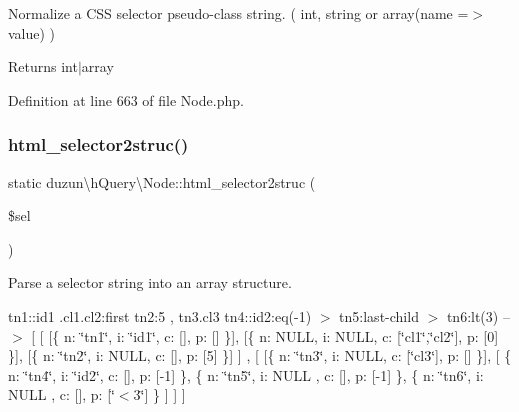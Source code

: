 Normalize a C\+SS selector pseudo-\/class string. ( int, string or array(name =$>$ value) )

\begin{DoxyReturn}{Returns}
int$\vert$array 
\end{DoxyReturn}


Definition at line 663 of file Node.\+php.

\mbox{\label{classduzun_1_1hQuery_1_1Node_ac54f15080a896a8bad6bb21bddf56bac}} 
\subsubsection{\texorpdfstring{html\+\_\+selector2struc()}{html\_selector2struc()}}
{\footnotesize\ttfamily static duzun\textbackslash{}h\+Query\textbackslash{}\+Node\+::html\+\_\+selector2struc (\begin{DoxyParamCaption}\item[{}]{\$sel }\end{DoxyParamCaption})\hspace{0.3cm}{\ttfamily [static]}}

Parse a selector string into an array structure.

tn1\+::id1 .cl1.\+cl2\+:first tn2\+:5 , tn3.\+cl3 tn4\+::id2\+:eq(-\/1) $>$ tn5\+:last-\/child $>$ tn6\+:lt(3) --$>$ \mbox{[} \mbox{[} \mbox{[}\{ n\+: \char`\"{}tn1\char`\"{}, i\+: \char`\"{}id1\char`\"{}, c\+: \mbox{[}\mbox{]}, p\+: \mbox{[}\mbox{]} \}\mbox{]}, \mbox{[}\{ n\+: N\+U\+LL, i\+: N\+U\+LL, c\+: \mbox{[}\char`\"{}cl1\char`\"{},\char`\"{}cl2\char`\"{}\mbox{]}, p\+: \mbox{[}0\mbox{]} \}\mbox{]}, \mbox{[}\{ n\+: \char`\"{}tn2\char`\"{}, i\+: N\+U\+LL, c\+: \mbox{[}\mbox{]}, p\+: \mbox{[}5\mbox{]} \}\mbox{]} \mbox{]} , \mbox{[} \mbox{[}\{ n\+: \char`\"{}tn3\char`\"{}, i\+: N\+U\+LL, c\+: \mbox{[}\char`\"{}cl3\char`\"{}\mbox{]}, p\+: \mbox{[}\mbox{]} \}\mbox{]}, \mbox{[} \{ n\+: \char`\"{}tn4\char`\"{}, i\+: \char`\"{}id2\char`\"{}, c\+: \mbox{[}\mbox{]}, p\+: \mbox{[}-\/1\mbox{]} \}, \{ n\+: \char`\"{}tn5\char`\"{}, i\+: N\+U\+LL , c\+: \mbox{[}\mbox{]}, p\+: \mbox{[}-\/1\mbox{]} \}, \{ n\+: \char`\"{}tn6\char`\"{}, i\+: N\+U\+LL , c\+: \mbox{[}\mbox{]}, p\+: \mbox{[}\char`\"{}$<$3\char`\"{}\mbox{]} \} \mbox{]} \mbox{]} \mbox{]}

